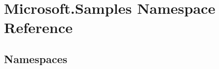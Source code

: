 \hypertarget{namespace_microsoft_1_1_samples}{}\section{Microsoft.\+Samples Namespace Reference}
\label{namespace_microsoft_1_1_samples}
\subsection*{Namespaces}
\begin{DoxyCompactItemize}
\end{DoxyCompactItemize}
